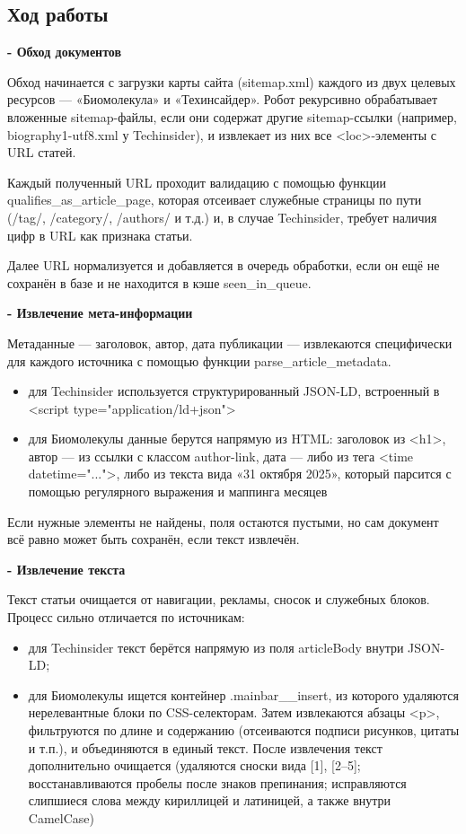 \documentclass[pdf, unicode, 12pt, a4paper, oneside, fleqn]{article}
\begin{document}
\subsection*{Ход работы}

\textbf{- Обход документов}

Обход начинается с загрузки карты сайта (sitemap.xml) каждого из 
двух целевых ресурсов — «Биомолекула» и «Техинсайдер». Робот 
рекурсивно обрабатывает вложенные sitemap-файлы, если они содержат 
другие sitemap-ссылки (например, biography1-utf8.xml у Techinsider), и 
извлекает из них все <loc>-элементы с URL статей. 

Каждый полученный URL проходит валидацию с помощью функции 
qualifies\_as\_article\_page, которая отсеивает служебные страницы по пути (/tag/, /category/, /authors/ и т.д.) и, в случае Techinsider, требует наличия цифр в URL как признака статьи.

Далее URL нормализуется и добавляется в очередь обработки, если 
он ещё не сохранён в базе и не находится в кэше seen\_in\_queue. 

\textbf{- Извлечение мета-информации}

Метаданные — заголовок, автор, дата публикации — извлекаются 
специфически для каждого источника с помощью функции 
parse\_article\_metadata. 
\begin{itemize}
    \item для Techinsider используется структурированный JSON-LD, встроенный в <script type="application/ld+json">
    \item для Биомолекулы данные берутся напрямую из HTML: заголовок из 
    <h1>, автор — из ссылки с классом author-link, дата — либо из тега <time datetime="...">, либо из текста вида «31 октября 2025», который парсится с помощью регулярного выражения и маппинга месяцев
\end{itemize}
Если нужные элементы не найдены, поля остаются пустыми, но сам 
документ всё равно может быть сохранён, если текст извлечён.

\textbf{- Извлечение текста}

Текст статьи очищается от навигации, рекламы, сносок и служебных 
блоков. Процесс сильно отличается по источникам: 
\begin{itemize}
    \item для Techinsider текст берётся напрямую из поля articleBody внутри JSON-LD; 
    \item для Биомолекулы ищется контейнер .mainbar\_\_insert, из которого удаляются нерелевантные блоки по CSS-селекторам. Затем извлекаются абзацы <p>, фильтруются по длине и содержанию (отсеиваются подписи рисунков, цитаты и т.п.), и объединяются в единый текст. После извлечения текст дополнительно очищается (удаляются сноски вида [1], [2–5]; восстанавливаются пробелы после знаков препинания; исправляются слипшиеся слова между кириллицей и латиницей, а также внутри CamelCase)
\end{itemize}
\end{document}
